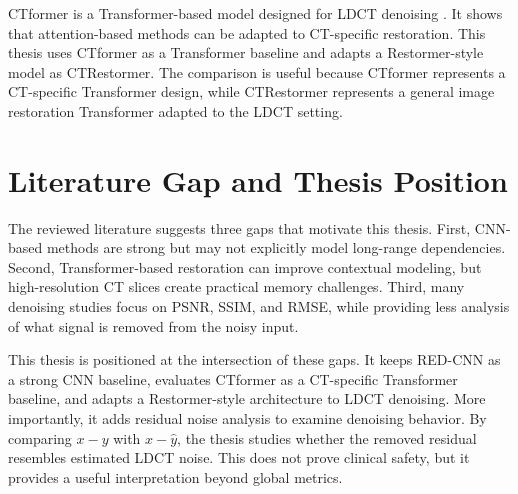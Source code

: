 CTformer is a Transformer-based model designed for LDCT denoising \cite{ctformer}. It shows that attention-based methods can be adapted to CT-specific restoration. This thesis uses CTformer as a Transformer baseline and adapts a Restormer-style model as CTRestormer. The comparison is useful because CTformer represents a CT-specific Transformer design, while CTRestormer represents a general image restoration Transformer adapted to the LDCT setting.

\section{Literature Gap and Thesis Position}

The reviewed literature suggests three gaps that motivate this thesis. First, CNN-based methods are strong but may not explicitly model long-range dependencies. Second, Transformer-based restoration can improve contextual modeling, but high-resolution CT slices create practical memory challenges. Third, many denoising studies focus on PSNR, SSIM, and RMSE, while providing less analysis of what signal is removed from the noisy input.

This thesis is positioned at the intersection of these gaps. It keeps RED-CNN as a strong CNN baseline, evaluates CTformer as a CT-specific Transformer baseline, and adapts a Restormer-style architecture to LDCT denoising. More importantly, it adds residual noise analysis to examine denoising behavior. By comparing \(x-y\) with \(x-\hat{y}\), the thesis studies whether the removed residual resembles estimated LDCT noise. This does not prove clinical safety, but it provides a useful interpretation beyond global metrics.
